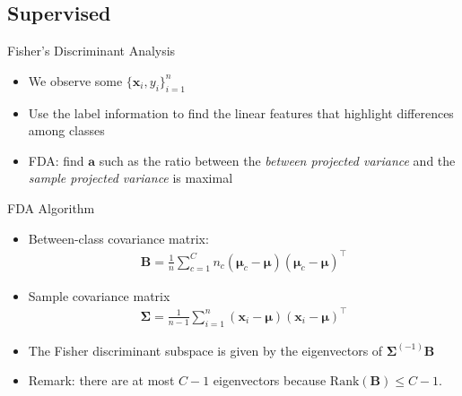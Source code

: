 \documentclass[10pt,aspectratio=1610]{beamer}
\begin{document}
\subsection{Supervised}
\label{sec:org8c7499a}
\begin{frame}[label={sec:org0f2b242}]{Fisher's Discriminant Analysis}
\begin{itemize}
\item We observe some \(\{\mathbf{x}_i,y_i\}_{i=1}^n\)
\item Use the label information to find the linear features that highlight differences among classes

\begin{center}
\end{center}
\item FDA: find \(\mathbf{a}\) such as the ratio between the \emph{between projected variance} and the \emph{sample projected variance} is maximal
\end{itemize}
\end{frame}
\begin{frame}[label={sec:org7ec3bef}]{FDA Algorithm}
\begin{itemize}
\item Between-class covariance matrix:
\begin{eqnarray*}
  \mathbf{B} = \frac{1}{n}\sum_{c=1}^Cn_c(\boldsymbol{\mu}_c-\boldsymbol{\mu})(\boldsymbol{\mu}_c-\boldsymbol{\mu})^\top
\end{eqnarray*}
\item Sample covariance matrix
\begin{eqnarray*}
  \boldsymbol{\Sigma} = \frac{1}{n-1}\sum_{i=1}^n(\mathbf{x}_i-\boldsymbol{\mu})(\mathbf{x}_i-\boldsymbol{\mu})^\top
\end{eqnarray*}
\item The Fisher discriminant subspace is given by the eigenvectors of \(\boldsymbol{\Sigma}^{(-1)}\mathbf{B}\)
\item Remark: there are at most \(C-1\) eigenvectors because \(\text{Rank}(\mathbf{B})\leq C-1\).
\end{itemize}
\end{frame}
\end{document}
